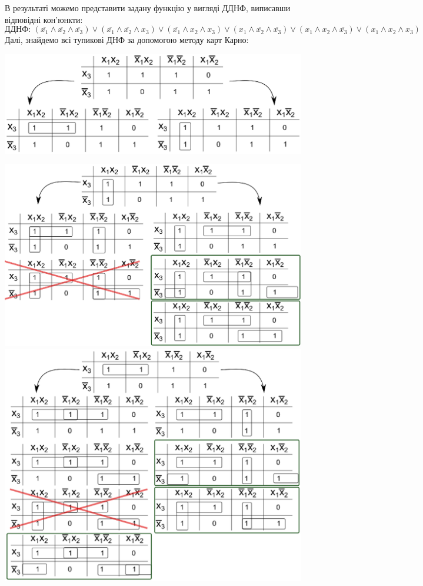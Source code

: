 \documentclass[14pt,a4paper]{scrartcl}
\theoremstyle{definition}
\theoremstyle{remark}
\theoremstyle{definition}
\theoremstyle{definition}
\begin{document}
  В результаті можемо представити задану функцію у вигляді ДДНФ, виписавши відповідні кон'юнкти:\\
  $$\textbf{ДДНФ: }
  (\overline{x_1} \land \overline{x_2} \land \overline{x_3})\lor
  (\overline{x_1} \land \overline{x_2} \land x_3)\lor
  (\overline{x_1} \land x_2 \land x_3)\lor
(x_1 \land \overline{x_2} \land \overline{x_3})\lor
(x_1 \land x_2 \land \overline{x_3})\lor
(x_1 \land x_2 \land x_3)
  $$
  Далі, знайдемо всі тупикові ДНФ за допомогою методу карт Карно:\\
  \begin{center}
    \includegraphics{karno_6.eps}
  \end{center}
  \begin{center}
    \includegraphics[scale=0.96]{karno_2.eps}
    \includegraphics[scale=0.96]{karno_3.eps}
  \end{center}
\end{document}
